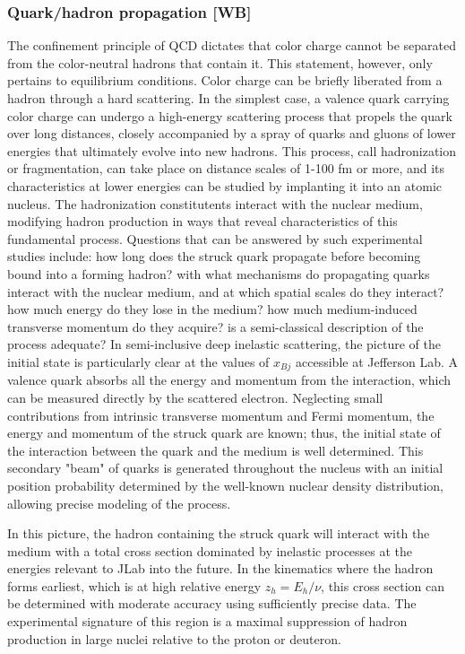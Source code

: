 \subsubsection{Quark/hadron propagation [WB]}
The confinement principle of QCD dictates that color charge cannot be separated from the color-neutral hadrons that contain it. This statement, however, only pertains to equilibrium conditions. Color charge can be briefly liberated from a hadron through a hard scattering. In the simplest case, a valence quark carrying color charge can undergo a high-energy scattering process that propels the quark over long distances, closely accompanied by a spray of quarks and gluons of lower energies that ultimately evolve into new hadrons. This process, call hadronization or fragmentation, can take place on distance scales of 1-100 fm or more, and its characteristics at lower energies can be studied by implanting it into an atomic nucleus. The hadronization constitutents interact with the nuclear medium, modifying hadron production in ways that reveal characteristics of this fundamental process. Questions that can be answered by such experimental studies include: how long does the struck quark propagate before becoming bound into a forming hadron? with what mechanisms do propagating quarks interact with the nuclear medium, and at which spatial scales do they interact? how much energy do they lose in the medium? how much medium-induced transverse momentum do they acquire? is a semi-classical description of the process adequate? In semi-inclusive deep inelastic scattering, the picture of the initial state is particularly clear at the values of $x_{Bj}$ accessible at Jefferson Lab. A valence quark absorbs all the energy and momentum from the interaction, which can be measured directly by the scattered electron. Neglecting small contributions from intrinsic transverse momentum and Fermi momentum, the energy and momentum of the struck quark are known; thus, the initial state of the interaction between the quark and the medium is well determined. This secondary "beam" of quarks is generated throughout the nucleus with an initial position probability determined by the well-known nuclear density distribution, allowing precise modeling of the process.

In this picture, the hadron containing the struck quark will interact with the medium with a total cross section dominated by inelastic processes at the energies relevant to JLab into the future. In the kinematics where the hadron forms earliest, which is at high relative energy $z_h=E_h/\nu$, this cross section can be determined with moderate accuracy using  sufficiently precise data. The experimental signature of this region is a maximal suppression of hadron production in large nuclei relative to the proton or deuteron.

